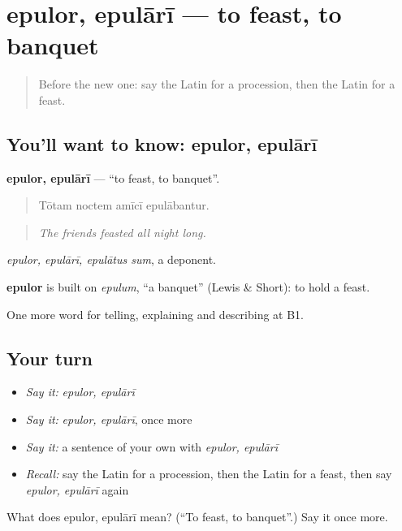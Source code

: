 \section[epulor, epulārī]{epulor, epulārī — to feast, to banquet}

\label{lesson:LA-C333-epulor}



\begin{quote}
Before the new one: say the Latin for a procession, then the Latin for a feast.
\end{quote}

\subsection*{You'll want to know: epulor, epulārī}
\textbf{epulor, epulārī} — \textquotedblleft{}to feast, to banquet\textquotedblright{}.

\begin{quote}
Tōtam noctem amīcī epulābantur.
\end{quote}

\begin{quote}
\emph{The friends feasted all night long.}
\end{quote}

\emph{epulor, epulārī, epulātus sum}, a deponent.

\begin{cousinweb}
\textbf{epulor} is built on \emph{epulum}, \textquotedblleft{}a banquet\textquotedblright{} (Lewis \& Short): to hold a feast.
\end{cousinweb}

\begin{grammarlens}[title={What you've built}]
One more word for telling, explaining and describing at B1.
\end{grammarlens}

\subsection*{Your turn}
\begin{itemize}
\raggedright
  \item \emph{Say it:} \emph{epulor, epulārī}
  \item \emph{Say it:} \emph{epulor, epulārī}, once more
  \item \emph{Say it:} a sentence of your own with \emph{epulor, epulārī}
  \item \emph{Recall:} say the Latin for a procession, then the Latin for a feast, then say \emph{epulor, epulārī} again
\end{itemize}

\begin{tcolorbox}[breakable,colback=teal!4,colframe=teal!35!black,title={Before you move on}]
What does epulor, epulārī mean? (\textquotedblleft{}To feast, to banquet\textquotedblright{}.) Say it once more.
\end{tcolorbox}
